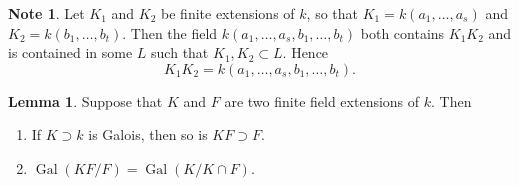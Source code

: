 \documentclass[10pt,letterpaper,cm]{nupset}
\theoremstyle{definition}
\newtheorem{note}[definition]{Note}
\theoremstyle{theorem}
\newtheorem{lemma}[definition]{Lemma}
\theoremstyle{remark}
\newcommand{\1}{\mathbf{1}}
\newcommand{\0}{\vec 0}
\DeclareMathOperator{\gal}{Gal}
\begin{document}
\begin{note}
Let $K_1$ and $K_2$ be finite extensions of $k$, so that $K_1 = k(a_1, \ldots, a_s)$ and $K_2= k(b_1, \ldots, b_t)$. Then the field $k(a_1, \ldots, a_s, b_1, \ldots, b_t)$ both contains  $K_1K_2$ and is contained in some $L$ such that $K_1, K_2 \subset L$. Hence $$K_1K_2 =  k(a_1, \ldots, a_s, b_1, \ldots, b_t).$$ 
\end{note}

\begin{lemma}
Suppose that $K$ and $F$ are two finite field extensions of $k$. Then
\begin{enumerate}[label=(\alph*)]
\item If $K\supset k$ is Galois, then so is $KF\supset F$.
\item $\gal(KF/F) = \gal(K/ K \cap F)$.
\end{enumerate}
\end{lemma}
\end{document}
